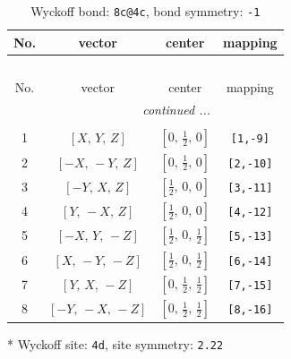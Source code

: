 \documentclass[fleqn,8pt]{jsarticle}
\begin{document}
\renewcommand{\arraystretch}{1.2}
\begin{longtable}{cccc}
\caption{Wyckoff bond: {\tt 8c@4c}, bond symmetry: {\tt -1}}
 \\
 \hline \hline
No. & vector & center & mapping \\ \hline \endfirsthead

\multicolumn{3}{l}{\tablename\ \thetable{}} \\
 \hline \hline
No. & vector & center & mapping \\ \hline \endhead

 \hline \hline
\multicolumn{3}{r}{\footnotesize\it continued ...} \\ \endfoot

 \hline \hline
\multicolumn{3}{r}{} \\ \endlastfoot

1 & $\left[ X,\, Y,\, Z \right]$ & $\left[ 0,\, \frac{1}{2},\, 0 \right]$ & {\tt [1,-9]} \\ \hline
2 & $\left[ - X,\, - Y,\, Z \right]$ & $\left[ 0,\, \frac{1}{2},\, 0 \right]$ & {\tt [2,-10]} \\ \hline
3 & $\left[ - Y,\, X,\, Z \right]$ & $\left[ \frac{1}{2},\, 0,\, 0 \right]$ & {\tt [3,-11]} \\ \hline
4 & $\left[ Y,\, - X,\, Z \right]$ & $\left[ \frac{1}{2},\, 0,\, 0 \right]$ & {\tt [4,-12]} \\ \hline
5 & $\left[ - X,\, Y,\, - Z \right]$ & $\left[ \frac{1}{2},\, 0,\, \frac{1}{2} \right]$ & {\tt [5,-13]} \\ \hline
6 & $\left[ X,\, - Y,\, - Z \right]$ & $\left[ \frac{1}{2},\, 0,\, \frac{1}{2} \right]$ & {\tt [6,-14]} \\ \hline
7 & $\left[ Y,\, X,\, - Z \right]$ & $\left[ 0,\, \frac{1}{2},\, \frac{1}{2} \right]$ & {\tt [7,-15]} \\ \hline
8 & $\left[ - Y,\, - X,\, - Z \right]$ & $\left[ 0,\, \frac{1}{2},\, \frac{1}{2} \right]$ & {\tt [8,-16]} \\
\end{longtable}
* Wyckoff site: {\tt 4d}, site symmetry: {\tt 2.22}
\renewcommand{\arraystretch}{1.2}
\end{document}

